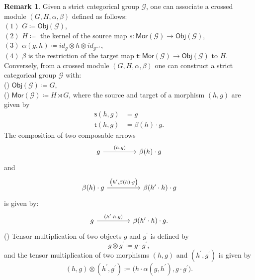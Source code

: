 \documentclass{article}
\theoremstyle{plain}
\theoremstyle{definition}
\newtheorem{rem}[thm]{Remark}
\newcommand{\rNum}[1]{\lowercase\expandafter{\romannumeral #1\relax}}
\begin{document}
\begin{rem}\label{2grpcross}
\cite{MR419643}
\cite[Remark 2.4 on page 574]{MR2805195} Given a strict categorical group $\mathcal{G}$, one can associate a crossed module $(G,H,\alpha,\beta)$ defined as follows: \\
$(1)$ $G \coloneq \mathsf{Obj}(\mathcal{G})$, \\
$(2)$ $H \coloneq$ the kernel of the source map $s:\mathsf{Mor}(\mathcal{G}) \longrightarrow \mathsf{Obj}(\mathcal{G})$, \\
$(3)$ $\alpha(g,h) \coloneq id_g \otimes h \otimes id_{g^{-1}}$, \\
$(4)$ $\beta$ is the restriction of the target map $\mathsf{t}:\mathsf{Mor}(\mathcal{G}) \longrightarrow \mathsf{Obj}(\mathcal{G})$ to $H$. \\
Conversely, from a crossed module $(G,H,\alpha,\beta)$ one can construct a strict categorical group $\mathcal{G}$ with: \\
(\rNum{1}) $\mathsf{Obj}(\mathcal{G}) \coloneq G$, \\
(\rNum{2}) $\mathsf{Mor}(\mathcal{G}) \coloneq H \rtimes G$, where the source and target of a morphism $(h,g)$ are given by
\begin{align*}
\mathsf{s}(h,g) & = g \\
\mathsf{t}(h,g) & = \beta(h) \cdot g.
\end{align*}
The composition of two composable arrows
\[
\begin{tikzcd}[row sep=huge,column sep=huge]
g \arrow[r,"{(h,g)}"] & \beta(h) \cdot g
\end{tikzcd}
\]
and
\[
\begin{tikzcd}[row sep=huge,column sep=huge]
\beta(h) \cdot g \arrow[r,"{\bigl(h^\prime,\beta(h) \cdot g\bigr)}"] & \beta(h^\prime \cdot h) \cdot g
\end{tikzcd}
\]
is given by:
\[
\begin{tikzcd}[row sep=huge,column sep=huge]
g \arrow[r,"{(h^\prime \cdot h,g)}"] & \beta(h^\prime \cdot h)  \cdot g.
\end{tikzcd}
\]
(\rNum{3}) Tensor multiplication of two objects $g$ and $g^\prime$ is defined by
$$g \otimes g^\prime \coloneq g \cdot g^\prime,$$
and the tensor multiplication of two morphisms $(h,g)$ and $(h^\prime,g^\prime)$ is given by
$$(h,g) \otimes (h^\prime,g^\prime) \coloneq \bigl(h \cdot \alpha(g,h^\prime),g \cdot g^\prime\bigr).$$
\end{rem}
\end{document}
